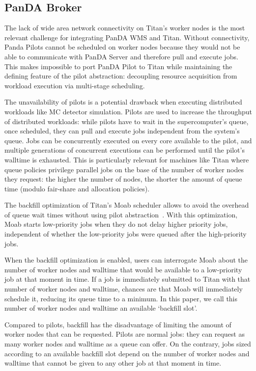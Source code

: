 \subsection{PanDA Broker}
\label{ssec:panda_titan}

The lack of wide area network connectivity on Titan's worker nodes is the most
relevant challenge for integrating PanDA WMS and Titan. Without connectivity,
Panda Pilots cannot be scheduled on worker nodes because they would not be able
to communicate with PanDA Server and therefore pull and execute jobs. This makes
impossible to port PanDA Pilot to Titan while maintaining the defining feature
of the pilot abstraction: decoupling resource acquisition from workload
execution via multi-stage scheduling.

The unavailability of pilots is a potential drawback when executing distributed
workloads like MC detector simulation. Pilots are used to increase the
throughput of distributed workloads: while pilots have to wait in the
supercomputer's queue, once scheduled, they can pull and execute jobs
independent from the system's queue. Jobs can be concurrently executed on
every core available to the pilot, and multiple generations of concurrent
executions can be performed until the pilot's walltime is exhausted. This is
particularly relevant for machines like Titan where queue policies privilege
parallel jobs on the base of the number of worker nodes they request: the higher
the number of nodes, the shorter the amount of queue time (modulo fair-share and
allocation policies).

The backfill optimization of Titan's Moab scheduler allows to avoid the overhead
of queue wait times without using pilot abstraction~\cite{maui_backfill_url}.
With this optimization, Moab starts low-priority jobs when they do not delay
higher priority jobs, independent of whether the low-priority jobs were queued
after the high-priority jobs.

When the backfill optimization is enabled, users can interrogate Moab about the
number of worker nodes and walltime that would be available to a low-priority
job at that moment in time. If a job is immediately submitted to Titan with that
number of worker nodes and walltime, chances are that Moab will immediately
schedule it, reducing its queue time to a minimum. In this paper, we call this
number of worker nodes and walltime an available `backfill slot'.

Compared to pilots, backfill has the disadvantage of limiting the amount of
worker nodes that can be requested. Pilots are normal jobs: they can request as
many worker nodes and walltime as a queue can offer. On the contrary, jobs sized
according to an available backfill slot depend on the number of worker nodes and
walltime that cannot be given to any other job at that moment in time.

